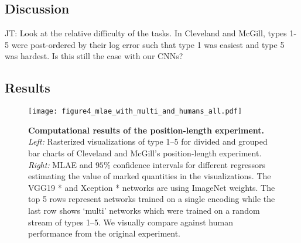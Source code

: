 %	
%	
%

\subsection{Discussion}

JT: Look at the relative difficulty of the tasks. In Cleveland and McGill, types 1-5 were post-ordered by their log error such that type 1 was easiest and type 5 was hardest. Is this still the case with our CNNs?

\subsection{Results}


\begin{figure}[!ht]
	\centering
	  \texttt{[image: figure4\_mlae\_with\_multi\_and\_humans\_all.pdf]}
  \caption{\textbf{Computational results of the position-length experiment.} \textit{Left:} Rasterized visualizations of type 1--5 for divided and grouped bar charts of Cleveland and McGill's position-length experiment. \textit{Right:} MLAE and $95\%$ confidence intervals for different regressors estimating the value of marked quantities in the visualizations. The VGG19 * and Xception * networks are using ImageNet weights. The top 5 rows represent networks trained on a single encoding while the last row shows `multi' networks which were trained on a random stream of types 1--5. We visually compare against human performance from the original experiment.}
	\label{fig:figure4_mlae}
\end{figure}
